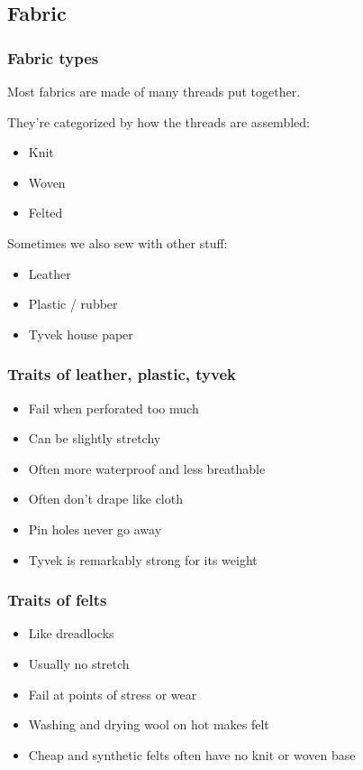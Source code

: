 \documentclass{beamer}
\begin{document}
\subsection{Fabric}

\begin{frame}[fragile]
\tableofcontents[currentsubsection]
\end{frame}

\begin{frame}[fragile]
\frametitle{Fabric types}
Most fabrics are made of many threads put together.

They're categorized by how the threads are assembled:
\begin{itemize}
\item Knit
\item Woven
\item Felted
\end{itemize}
Sometimes we also sew with other stuff:
\begin{itemize}
\item Leather
\item Plastic / rubber
\item Tyvek house paper
\end{itemize}
\end{frame}

\begin{frame}[fragile]
\frametitle{Traits of leather, plastic, tyvek}
\begin{itemize}
\item Fail when perforated too much
\item Can be slightly stretchy
\item Often more waterproof and less breathable
\item Often don't drape like cloth
\item Pin holes never go away
\item Tyvek is remarkably strong for its weight
\end{itemize}
\end{frame}

\begin{frame}[fragile]
\frametitle{Traits of felts}
\begin{itemize}
\item Like dreadlocks
\item Usually no stretch
\item Fail at points of stress or wear
\item Washing and drying wool on hot makes felt
\item Cheap and synthetic felts often have no knit or woven base
\end{itemize}
\end{frame}
\end{document}
